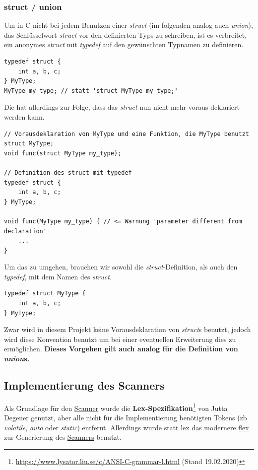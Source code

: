 \documentclass[oneside]{ausarbeitung}
\begin{document}
\subsubsection{struct / union}
\label{subsub:struct_unions}
Um in C nicht bei jedem Benutzen einer \textit{struct} (im folgenden analog auch \textit{union}), das Schlüsselwort \textit{struct} vor den definierten Typs zu schreiben, ist es verbreitet, ein anonymes \textit{struct} mit \textit{typedef} auf den gewünschten Typnamen zu definieren.
\begin{lstlisting}[label={lst:typedef_struct}, caption={Benennen eines anonymen Typs mit typedef}]
typedef struct {
    int a, b, c;
} MyType;
MyType my_type; // statt 'struct MyType my_type;'
\end{lstlisting}
Die hat allerdings zur Folge, dass das \textit{struct} nun nicht mehr voraus deklariert werden kann.
\begin{lstlisting}[label={lst:typedef_struct_forward_declaration}, caption={Problem beim Vorausdeklarieren eines anonymen Typs}]
// Vorausdeklaration von MyType und eine Funktion, die MyType benutzt
struct MyType;
void func(struct MyType my_type);

// Definition des struct mit typedef
typedef struct {
    int a, b, c;
} MyType;

void func(MyType my_type) { // <= Warnung 'parameter different from declaration'
    ...
}
\end{lstlisting}
Um das zu umgehen, brauchen wir sowohl die \textit{struct}-Definition, als auch den \textit{typedef}, mit dem Namen des \textit{struct}.
\begin{lstlisting}[label={lst:typedef_struct_new}, caption={Lösung zur Definition von structs}]
typedef struct MyType { 
    int a, b, c;
} MyType;
\end{lstlisting}
Zwar wird in diesem Projekt keine Vorausdeklaration von \textit{struct}s benutzt, jedoch wird diese Konvention benutzt um bei einer eventuellen Erweiterung dies zu ermöglichen. \textbf{Dieses Vorgehen gilt auch analog für die Definition von \textit{union}s.}

\subsection{Implementierung des Scanners}
\label{sub:impl_scanner}
Als Grundlage für den \hyperref[sub:scanner]{Scanner} wurde die \textbf{Lex-Spezifikation}\footnote{\url{https://www.lysator.liu.se/c/ANSI-C-grammar-l.html} (Stand 19.02.2020)} von Jutta Degener genutzt, aber alle nicht für die Implementierung benötigten Tokens (\ac{zb} \textit{volatile}, \textit{auto} oder \textit{static}) entfernt. Allerdings wurde statt lex das modernere \hyperref[sub:flex]{flex} zur Generierung des \hyperref[sub:scanner]{Scanners} benutzt.
\end{document}
